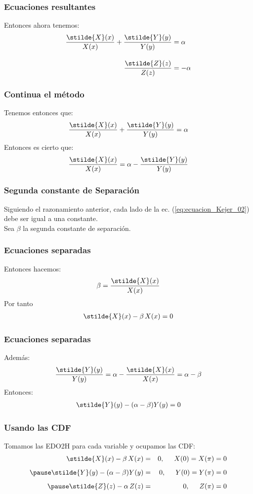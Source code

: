 \begin{frame}
\frametitle{Ecuaciones resultantes}
Entonces ahora tenemos:
\begin{align*}
\dfrac{\stilde{X} (x)}{X(x)} + \dfrac{\stilde{Y} (y)}{Y(y)} &= \alpha \\[1em]
\dfrac{\stilde{Z} (z)}{Z(z)} &= - \alpha
\end{align*}
\end{frame}
\begin{frame}
\frametitle{Continua el método}
Tenemos entonces que:
\begin{align*}
\dfrac{\stilde{X} (x)}{X(x)} + \dfrac{\stilde{Y} (y)}{Y(y)} = \alpha
\end{align*}
\pause
Entonces es cierto que:
\begin{align}
\dfrac{\stilde{X} (x)}{X(x)} = \alpha - \dfrac{\stilde{Y} (y)}{Y(y)}
\label{eq:ecuacion_Kejer_02}
\end{align}
\end{frame}
\begin{frame}
\frametitle{Segunda constante de Separación}
Siguiendo el razonamiento anterior, cada lado de la ec. (\ref{eq:ecuacion_Kejer_02}) debe ser igual a una constante.
\\
\bigskip
\pause
Sea $\beta$ la segunda constante de separación.
\end{frame}
\begin{frame}
\frametitle{Ecuaciones separadas}
Entonces hacemos:
\begin{align*}
\beta = \dfrac{\stilde{X} (x)}{X(x)} 
\end{align*}
\pause
Por tanto
\begin{align*}
\stilde{X} (x) - \beta \, X(x) = 0
\end{align*}
\end{frame}
\begin{frame}
\frametitle{Ecuaciones separadas}
Además:
\begin{align*}
\dfrac{\stilde{Y} (y)}{Y(y)} = \alpha - \dfrac{\stilde{X} (x)}{X(x)} = \alpha - \beta
\end{align*}
\pause
Entonces:
\begin{align*}
\stilde{Y} (y) - (\alpha - \beta) Y(y) = 0
\end{align*}
\end{frame}
\begin{frame}
\frametitle{Usando las CDF}
Tomamos las EDO2H para cada variable y ocupamos las CDF:
\begin{eqnarray}
\stilde{X} (x) - \beta \, X(x) &=& 0, \hspace{0.5cm} X(0) = X(\pi) = 0 \label{eq:ecuacion_Kejer_03} \\[0.5em] \pause
\stilde{Y} (y) - (\alpha - \beta) Y(y) &=& 0, \hspace{0.5cm} Y(0) = Y(\pi) = 0 \label{eq:ecuacion_Kejer_04} \\[0.5em] \pause
\stilde{Z} (z) - \alpha \, Z(z) &=& 0, \hspace{0.5cm} Z(\pi) = 0 \label{eq:ecuacion_Kejer_05}
\end{eqnarray}
\end{frame}
